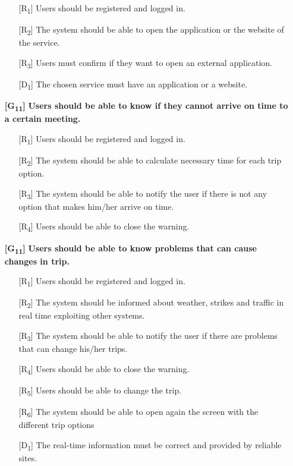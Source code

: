 \documentclass[12pt,titlepage]{article}
\begin{document}
\begin{itemize}
\begin{itemize}
\item[{[R\textsubscript{1}]}]  Users should be registered and logged in.
\item[{[R\textsubscript{2}]}]  The system should be able to open the application or the website of the service.
\item[{[R\textsubscript{3}]}] Users must confirm if they want to open an external application.
\item[{[D\textsubscript{1}]}]  The chosen service must have an application or a website.
\end{itemize}
\item[\textbf{ {[G\textsubscript{11}]}}]	\textbf{	Users should be able to know if they cannot arrive on time to a certain meeting.}
\begin{itemize}
\item[{[R\textsubscript{1}]}]  Users should be registered and logged in.
\item[{[R\textsubscript{2}]}] The system should be able to calculate necessary time for each trip option.
\item[{[R\textsubscript{3}]}]  The system should be able to notify the user if there is not any option that makes him/her arrive on time.
\item[{[R\textsubscript{4}]}] Users should be able to close the warning.
\end{itemize}
\item[\textbf{ {[G\textsubscript{11}]}}]	\textbf{	Users should be able to know problems that can cause changes in trip.}
\begin{itemize}
\item[{[R\textsubscript{1}]}]  Users should be registered and logged in.
\item[{[R\textsubscript{2}]}] The system should be informed about weather, strikes and traffic in real time exploiting other systems.
\item[{[R\textsubscript{3}]}]  The system should be able to notify the user if there are problems that can change his/her trips.
\item[{[R\textsubscript{4}]}] Users should be able to close the warning.
\item[{[R\textsubscript{5}]}] Users should be able to change the trip.
\item[{[R\textsubscript{6}]}]  The system should be able to open again the screen with the different trip options
\item[{[D\textsubscript{1}]}]  The real-time information must be correct and provided by reliable sites.
\end{itemize}
\end{itemize}
\end{document}
